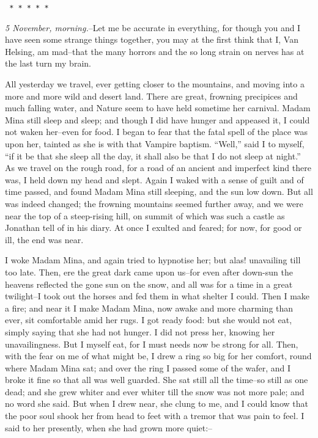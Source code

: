 \documentclass[12pt,openright]{book}
\begin{document}
\texttt{   *       *       *       *       *}

\textit{5 November, morning.}–Let me be accurate in everything, for though you and I have seen some strange things together, you may at the first think that I, Van Helsing, am mad–that the many horrors and the so long strain on nerves has at the last turn my brain.

All yesterday we travel, ever getting closer to the mountains, and moving into a more and more wild and desert land. There are great, frowning precipices and much falling water, and Nature seem to have held sometime her carnival. Madam Mina still sleep and sleep; and though I did have hunger and appeased it, I could not waken her–even for food. I began to fear that the fatal spell of the place was upon her, tainted as she is with that Vampire baptism. “Well,” said I to myself, “if it be that she sleep all the day, it shall also be that I do not sleep at night.” As we travel on the rough road, for a road of an ancient and imperfect kind there was, I held down my head and slept. Again I waked with a sense of guilt and of time passed, and found Madam Mina still sleeping, and the sun low down. But all was indeed changed; the frowning mountains seemed further away, and we were near the top of a steep-rising hill, on summit of which was such a castle as Jonathan tell of in his diary. At once I exulted and feared; for now, for good or ill, the end was near.

I woke Madam Mina, and again tried to hypnotise her; but alas! unavailing till too late. Then, ere the great dark came upon us–for even after down-sun the heavens reflected the gone sun on the snow, and all was for a time in a great twilight–I took out the horses and fed them in what shelter I could. Then I make a fire; and near it I make Madam Mina, now awake and more charming than ever, sit comfortable amid her rugs. I got ready food: but she would not eat, simply saying that she had not hunger. I did not press her, knowing her unavailingness. But I myself eat, for I must needs now be strong for all. Then, with the fear on me of what might be, I drew a ring so big for her comfort, round where Madam Mina sat; and over the ring I passed some of the wafer, and I broke it fine so that all was well guarded. She sat still all the time–so still as one dead; and she grew whiter and ever whiter till the snow was not more pale; and no word she said. But when I drew near, she clung to me, and I could know that the poor soul shook her from head to feet with a tremor that was pain to feel. I said to her presently, when she had grown more quiet:–
\end{document}
